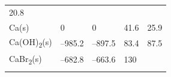 \documentclass[
]{book}
\theoremstyle{definition}
\theoremstyle{definition}
\theoremstyle{definition}
\theoremstyle{remark}
\begin{document}
\begin{longtable}[]{@{}lllll@{}}
\begin{minipage}[t]{0.18\columnwidth}
20.8\strut
\end{minipage}\tabularnewline
\begin{minipage}[t]{0.10\columnwidth}\raggedright
Ca(s)\strut
\end{minipage} & \begin{minipage}[t]{0.19\columnwidth}\raggedright
0\strut
\end{minipage} & \begin{minipage}[t]{0.20\columnwidth}\raggedright
0\strut
\end{minipage} & \begin{minipage}[t]{0.18\columnwidth}\raggedright
41.6\strut
\end{minipage} & \begin{minipage}[t]{0.18\columnwidth}\raggedright
25.9\strut
\end{minipage}\tabularnewline
\begin{minipage}[t]{0.10\columnwidth}\raggedright
Ca(OH)\textsubscript{2}(s)\strut
\end{minipage} & \begin{minipage}[t]{0.19\columnwidth}\raggedright
--985.2\strut
\end{minipage} & \begin{minipage}[t]{0.20\columnwidth}\raggedright
--897.5\strut
\end{minipage} & \begin{minipage}[t]{0.18\columnwidth}\raggedright
83.4\strut
\end{minipage} & \begin{minipage}[t]{0.18\columnwidth}\raggedright
87.5\strut
\end{minipage}\tabularnewline
\begin{minipage}[t]{0.10\columnwidth}\raggedright
CaBr\textsubscript{2}(s)\strut
\end{minipage} & \begin{minipage}[t]{0.19\columnwidth}\raggedright
--682.8\strut
\end{minipage} & \begin{minipage}[t]{0.20\columnwidth}\raggedright
--663.6\strut
\end{minipage} & \begin{minipage}[t]{0.18\columnwidth}\raggedright
130\strut
\end{minipage} & \begin{minipage}[t]{0.18\columnwidth}\raggedright
\strut
\end{minipage}\tabularnewline
\begin{minipage}[t]{0.10\columnwidth}\raggedright

\end{minipage}
\end{longtable}
\end{document}
